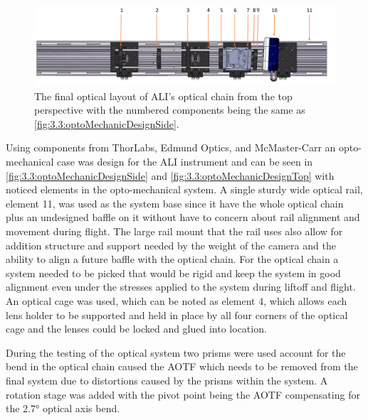 \begin{figure}
    \begin{center}
    \includegraphics[width=1.0\textwidth]{./Images/3-3-OptoMechanicalSolidWorksLayoutTop.pdf}
    \caption[ALI's Opto-mechanical Layout (Top)]{The final optical layout of ALI's optical chain from the top perspective with the numbered components being the same as \autoref{fig:3.3:optoMechanicDesignSide}.}
   \label{fig:3.3:optoMechanicDesignTop}
    \end{center}
\end{figure}

Using components from ThorLabs, Edmund Optics, and McMaster-Carr an opto-mechanical case was design for the ALI instrument and can be seen in \autoref{fig:3.3:optoMechanicDesignSide} and \autoref{fig:3.3:optoMechanicDesignTop} with noticed elements in the opto-mechanical system. A single sturdy wide optical rail, element 11, was used as the system base since it have the whole optical chain plus an undesigned baffle on it without have to concern about rail alignment and movement during flight. The large rail mount that the rail uses also allow for addition structure and support needed by the weight of the camera and the ability to align a future baffle with the optical chain. For the optical chain a system needed to be picked that would be rigid and keep the system in good alignment even under the stresses applied to the system during liftoff and flight. An optical cage was used, which can be noted as element 4, which allows each lens holder to be supported and held in place by all four corners of the optical cage and the lenses could be locked and glued into location.

During the testing of the optical system two prisms were used account for the bend in the optical chain caused the AOTF which needs to be removed from the final system due to distortions caused by the prisms within the system. A rotation stage was added with the pivot point being the AOTF compensating for the 2.7\si{\degree} optical axis bend.


